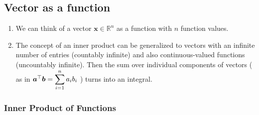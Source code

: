 \subsection{Vector as a function}


\begin{enumerate}
    \item We can think of a vector $\bm{x} \in \mathbb{R}^n$ as a function with $n$ function values.
    \hfill \cite{mfml/book/mml/Deisenroth-Faisal-Ong}

    \item The concept of an inner product can be generalized to vectors with an infinite number of entries (countably infinite) and also continuous-valued functions (uncountably infinite).
    Then the sum over individual components of vectors ( as in $\bm{a}^\top \bm{b} = \displaystyle\sum^n_{i=1} a_i b_i$ ) turns into an integral.
    \hfill \cite{mfml/book/mml/Deisenroth-Faisal-Ong}

    
\end{enumerate}




\subsubsection{Inner Product of Functions}


